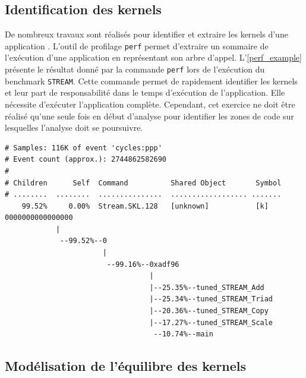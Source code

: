 \subsection{Identification des kernels}
    
    
    De nombreux travaux sont réalisés pour identifier et extraire les \glspl{kernel} d'une application \cite{castro2015cere, brunst2013custom}. L'outil de profilage \verb|perf| \cite{de2010new} permet d'extraire un sommaire de l'exécution d'une application en représentant son arbre d'appel. L'\autoref{perf_example} présente le résultat donné par la commande \verb|perf| lors de l'exécution du benchmark \verb|STREAM|. Cette commande permet de rapidement identifier les \glspl{kernel} et leur part de responsabilité dans le temps d'exécution de l'application. Elle nécessite d'exécuter l'application complète. Cependant, cet exercice ne doit être réalisé qu'une seule fois en début d'analyse pour identifier les zones de code sur lesquelles l'analyse doit se poursuivre.
    


\begin{lstlisting}[caption={Exemple d'utilisation de perf avec la commande \texttt{perf record  -g  -F 97} lors de l'exécution du benchmark \texttt{STREAM}. Le rapport d'exécution est obtenu avec la commande \texttt{perf report --stdio}.}, float, label={perf_example}]
# Samples: 116K of event 'cycles:ppp'
# Event count (approx.): 2744862582690
#
# Children      Self  Command          Shared Object       Symbol                                                                       
# ........  ........  ...............  .................. .......
    99.52%     0.00%  Stream.SKL.128   [unknown]           [k] 0000000000000000
            |          
             --99.52%--0
                       |          
                        --99.16%--0xadf96
                                  |
                                  |--25.35%--tuned_STREAM_Add   
                                  |--25.34%--tuned_STREAM_Triad
                                  |--20.36%--tuned_STREAM_Copy
                                  |--17.27%--tuned_STREAM_Scale
                                   --10.74%--main

\end{lstlisting}



\subsection{Modélisation de l'équilibre des kernels}
    
